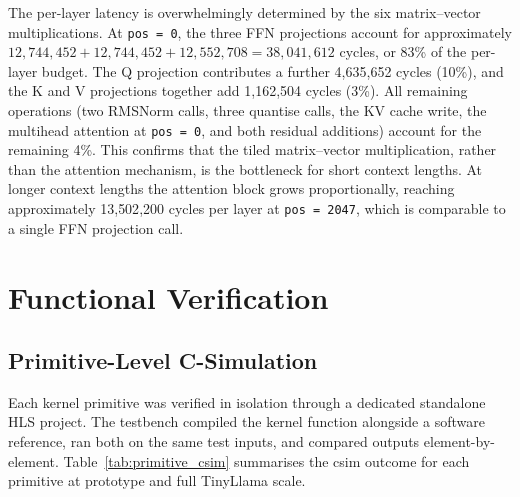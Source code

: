 The per-layer latency is overwhelmingly determined by the six matrix--vector
multiplications. At \texttt{pos\,=\,0}, the three FFN projections account for
approximately $12{,}744{,}452 + 12{,}744{,}452 + 12{,}552{,}708 = 38{,}041{,}612$
cycles, or 83\% of the per-layer budget. The Q projection contributes a
further 4{,}635{,}652 cycles (10\%), and the K and V projections together add
1{,}162{,}504 cycles (3\%). All remaining operations (two RMSNorm calls, three quantise calls, the
KV cache write, the multihead attention at \texttt{pos\,=\,0}, and both
residual additions) account for the remaining 4\%.
This confirms that the tiled matrix--vector multiplication, rather than the
attention mechanism, is the bottleneck for short context lengths. At longer
context lengths the attention block grows proportionally, reaching
approximately 13{,}502{,}200 cycles per layer at \texttt{pos\,=\,2047}, which
is comparable to a single FFN projection call.

\section{Functional Verification}
\label{sec:functional_verification}

\subsection{Primitive-Level C-Simulation}
\label{subsec:primitive_csim}

Each kernel primitive was verified in isolation through a dedicated standalone
HLS project. The testbench compiled the kernel function alongside a
software reference, ran both on the same test inputs, and compared outputs
element-by-element. Table~\ref{tab:primitive_csim} summarises the csim
outcome for each primitive at prototype and full TinyLlama scale.

